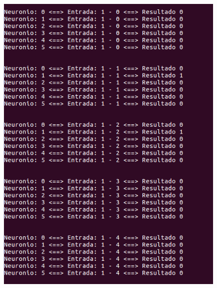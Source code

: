 \documentclass[hidelinks,12pt]{article}
\begin{document}
		\begin{figure}[!h]
			\centering
			\includegraphics[scale=0.5]{Figures/E3S1P1R.png}
		\end{figure}
		
\end{document}
